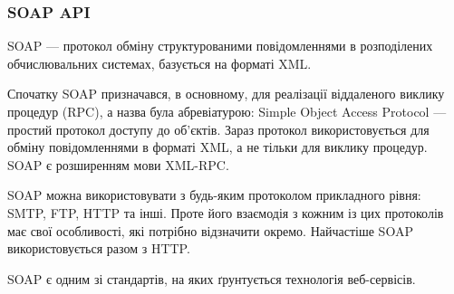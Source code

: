 \subsubsection{SOAP API}

SOAP — протокол обміну структурованими повідомленнями в розподілених обчислювальних системах, базується на форматі XML.

Спочатку SOAP призначався, в основному, для реалізації віддаленого виклику процедур (RPC), а назва була абревіатурою: Simple Object Access Protocol — простий протокол доступу до об'єктів. Зараз протокол використовується для обміну повідомленнями в форматі XML, а не тільки для виклику процедур. SOAP є розширенням мови XML-RPC.

SOAP можна використовувати з будь-яким протоколом прикладного рівня: SMTP, FTP, HTTP та інші. Проте його взаємодія з кожним із цих протоколів має свої особливості, які потрібно відзначити окремо. Найчастіше SOAP використовується разом з HTTP.

SOAP є одним зі стандартів, на яких ґрунтується технологія веб-сервісів.
